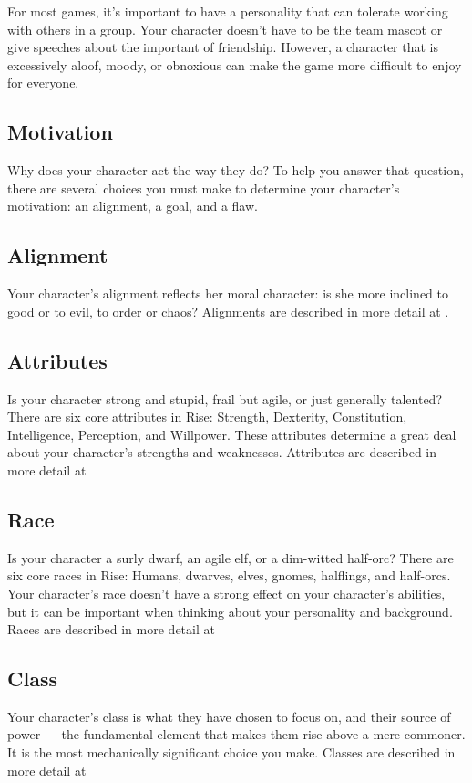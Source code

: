         For most games, it's important to have a personality that can tolerate working with others in a group.
        Your character doesn't have to be the team mascot or give speeches about the important of friendship.
        However, a character that is excessively aloof, moody, or obnoxious can make the game more difficult to enjoy for everyone.

    \subsection{Motivation}

        Why does your character act the way they do?
        To help you answer that question, there are several choices you must make to determine your character's motivation: an alignment, a goal, and a flaw.

    \subsection{Alignment}

        Your character's alignment reflects her moral character: is she more inclined to good or to evil, to order or chaos?
        Alignments are described in more detail at .

    \subsection{Attributes}
        Is your character strong and stupid, frail but agile, or just generally talented?
        There are six core attributes in Rise: Strength, Dexterity, Constitution, Intelligence, Perception, and Willpower.
        These attributes determine a great deal about your character's strengths and weaknesses.
        Attributes are described in more detail at 

    \subsection{Race}
        Is your character a surly dwarf, an agile elf, or a dim-witted half-orc?
        There are six core races in Rise: Humans, dwarves, elves, gnomes, halflings, and half-orcs.
        Your character's race doesn't have a strong effect on your character's abilities, but it can be important when thinking about your personality and background.
        Races are described in more detail at 

    \subsection{Class}
        Your character's class is what they have chosen to focus on, and their source of power --- the fundamental element that makes them rise above a mere commoner.
        It is the most mechanically significant choice you make.
        Classes are described in more detail at 

